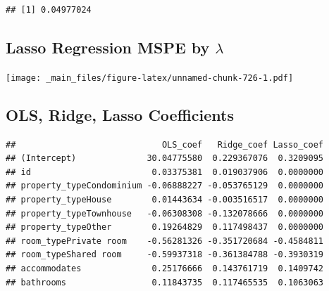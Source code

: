 \documentclass[]{book}
\newenvironment{Shaded}{\begin{snugshade}}{\end{snugshade}}
\newcommand{\KeywordTok}[1]{\textcolor[rgb]{0.13,0.29,0.53}{\textbf{#1}}}
\newcommand{\DataTypeTok}[1]{\textcolor[rgb]{0.13,0.29,0.53}{#1}}
\newcommand{\DecValTok}[1]{\textcolor[rgb]{0.00,0.00,0.81}{#1}}
\newcommand{\StringTok}[1]{\textcolor[rgb]{0.31,0.60,0.02}{#1}}
\newcommand{\OperatorTok}[1]{\textcolor[rgb]{0.81,0.36,0.00}{\textbf{#1}}}
\newcommand{\NormalTok}[1]{#1}
\begin{document}
\begin{Shaded}
\end{Shaded}

\begin{verbatim}
## [1] 0.04977024
\end{verbatim}

\subsection{\texorpdfstring{Lasso Regression MSPE by
\(\lambda\)}{Lasso Regression MSPE by \textbackslash{}lambda}}\label{lasso-regression-mspe-by-lambda}

\texttt{[image: \_main\_files/figure-latex/unnamed-chunk-726-1.pdf]}

\subsection{OLS, Ridge, Lasso
Coefficients}\label{ols-ridge-lasso-coefficients}

\begin{Shaded}
\end{Shaded}

\begin{verbatim}
##                             OLS_coef   Ridge_coef Lasso_coef
## (Intercept)              30.04775580  0.229367076  0.3209095
## id                        0.03375381  0.019037906  0.0000000
## property_typeCondominium -0.06888227 -0.053765129  0.0000000
## property_typeHouse        0.01443634 -0.003516517  0.0000000
## property_typeTownhouse   -0.06308308 -0.132078666  0.0000000
## property_typeOther        0.19264829  0.117498437  0.0000000
## room_typePrivate room    -0.56281326 -0.351720684 -0.4584811
## room_typeShared room     -0.59937318 -0.361384788 -0.3930319
## accommodates              0.25176666  0.143761719  0.1409742
## bathrooms                 0.11843735  0.117465535  0.1063063
\end{verbatim}
\end{document}
